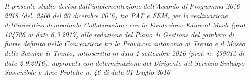 \documentclass[11pt,a4paper,italian,twoside,openany]{memoir}
\newcommand\BackgroundPicTwo{
  \put(0,0){
    \parbox[b][\paperheight]{\paperwidth}{%
      \vfill
      \centering
      \texttt{[image: 2.pdf]}
      \vfill
    }
  }
}
\begin{document}
{\footnotesize \emph{Il presente studio deriva dall'implementazione dell'Accordo di Programma 2016-2018 (del. 2406 del 20 dicembre 2016) tra PAT e FEM, per la realizzazione dell'iniziativa denominata Collaborazione con la Fondazione Edmund Mach (prot. 124726 di data 6.3.2017) alla redazione del Piano di Gestione del gambero di fiume definito nella Convenzione tra la Provincia autonoma di Trento e il Museo delle Scienze di Trento, sottoscritta in data 1 settembre 2016 (prot. n. 459014 di data 2.9.2016), approvata con determinazione del Dirigente del Servizio Sviluppo Sostenibile e Aree Protette n. 46 di data 01 Luglio 2016}}
\vspace{.2cm}

\newpage
\begin{KeepFromToc}
  \tableofcontents
\end{KeepFromToc}

\newpage
\AddToShipoutPicture*{\BackgroundPicTwo}
\pagestyle{LIFEstyle}
\end{document}
